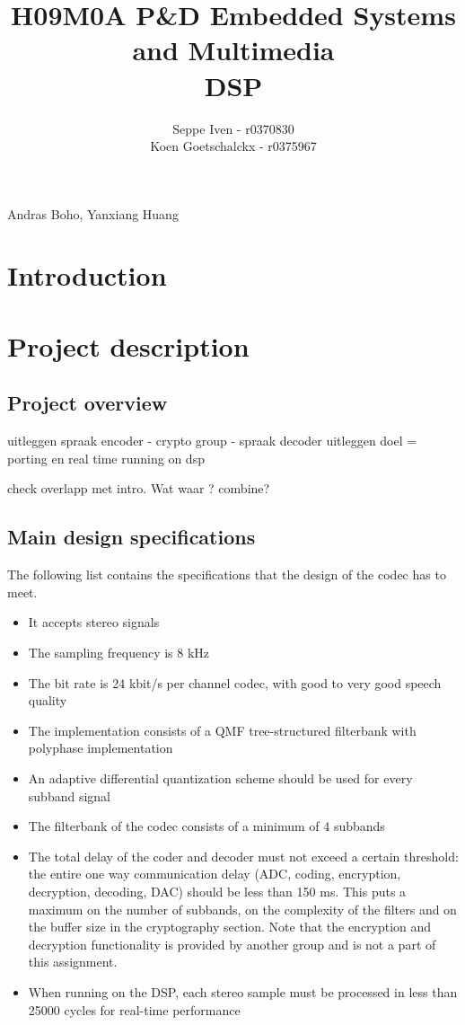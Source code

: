 \documentclass[a4paper]{article}
\title{H09M0A P\&D Embedded Systems and Multimedia \\ DSP}
\author{Seppe Iven - r0370830 \\ Koen Goetschalckx - r0375967}
\begin{document}
 
\maketitle
\begin{center}Andras Boho, Yanxiang Huang
\end{center}

\section{Introduction}
\section{Project description}
\subsection{Project overview}
uitleggen spraak encoder - crypto group - spraak decoder
uitleggen doel = porting en real time running on dsp

check overlapp met intro. Wat waar ?  combine?
\subsection{Main design specifications}
The following list contains the specifications that the design of the codec has to meet.

\begin{itemize}
\item It accepts stereo signals
\item The sampling frequency is 8 kHz
\item The bit rate is 24 kbit/s per channel codec, with good to very good speech quality
\item The implementation consists of a QMF tree-structured filterbank with polyphase implementation
\item An adaptive differential quantization scheme should be used for every subband signal
\item The filterbank of the codec consists of a minimum of 4 subbands
\item The total delay of the coder and decoder must not exceed a certain threshold: the entire one way communication delay (ADC, coding, encryption, decryption, decoding, DAC) should be less than 150 ms. This puts a maximum on the number of subbands, on the complexity of the filters and on the buffer size in the cryptography section. Note that the encryption and decryption functionality is provided by another group and is not a part of this assignment.
\item When running on the DSP, each stereo sample must be processed in less than 25000 cycles for real-time performance

\end{itemize}
\end{document}
